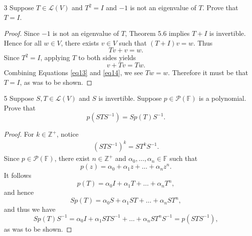\documentclass[11pt]{extarticle}
\newenvironment{problem}[1]{\begin{prob*}{#1}{}}{\end{prob*}}
\newcommand{\Z}{\mathbb{Z}}
\newcommand{\F}{\mathbb{F}}
\newcommand{\poly}{\mathcal{P}}
\newcommand{\Hom}{\mathcal{L}}
\begin{document}
\begin{problem}{3}
Suppose $T\in\Hom(V)$ and $T^2 = I$ and $-1$ is not an eigenvalue of $T$.  Prove that $T = I$.  
\end{problem}
\begin{proof}
Since $-1$ is not an eigenvalue of $T$, Theorem 5.6 implies $T + I$ is invertible.  Hence for all $w\in V$, there exists $v\in V$ such that $(T+I)v = w$.  Thus 
\begin{equation}
Tv + v = w. \label{eq13}
\end{equation}
Since $T^2 = I$, applying $T$ to both sides yields
\begin{equation}
v + Tv = Tw. \label{eq14}
\end{equation}  
Combining Equations \ref{eq13} and \ref{eq14}, we see $Tw = w$.  Therefore it must be that $T= I$, as was to be shown.
\end{proof}

\begin{problem}{5}
Suppose $S,T\in\Hom(V)$ and $S$ is invertible.  Suppose $p\in\poly(\F)$ is a polynomial.  Prove that 
\begin{equation*}
p\left(STS^{-1}\right) = Sp(T)S^{-1}.
\end{equation*}
\end{problem}
\begin{proof}
For $k\in\Z^+$, notice
\begin{align*}
(STS^{-1})^k = ST^kS^{-1}.
\end{align*}
Since $p\in\poly(\F)$, there exist $n\in\Z^+$ and $\alpha_0,\dots,\alpha_n\in\F$ such that 
\begin{equation*}
p(z) = \alpha_0 + \alpha_1z + \dots + \alpha_n z^n. 
\end{equation*}
It follows
\begin{equation*}
p(T) = \alpha_0 I  + \alpha_1T + \dots + \alpha_nT^n,
\end{equation*}
and hence
\begin{equation*}
Sp(T) = \alpha_0 S + \alpha_1ST + \dots + \alpha_n ST^n,
\end{equation*}
and thus we have
\begin{equation*}
Sp(T)S^{-1} = \alpha_0 I + \alpha_1 STS^{-1} + \dots + \alpha_n ST^nS^{-1} = p(STS^{-1}),
\end{equation*}
as was to be shown.
\end{proof}
\end{document}
